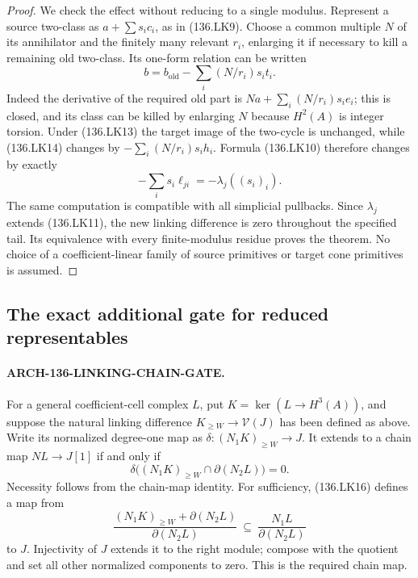 \begin{proof}
We check the effect without reducing to a single modulus.
Represent a source two-class as \(a+\sum s_i c_i\), as
in (136.LK9).  Choose a common multiple \(N\) of its
annihilator and the finitely many relevant \(r_i\), enlarging
it if necessary to kill a remaining old two-class.  Its
one-form relation can be written
\[
                    b=b_{\mathrm{old}}-
                         \sum_i(N/r_i)s_i t_i.
                                                               \tag{136.LK14}
\]
Indeed the derivative of the required old part is
\(Na+\sum_i(N/r_i)s_i e_i\); this is closed, and its
class can be killed by enlarging \(N\) because \(H^2(A)\)
is integer torsion.  Under (136.LK13) the target image of the
two-cycle is unchanged, while (136.LK14) changes by
\(-\sum_i(N/r_i)s_i h_i\).  Formula (136.LK10) therefore
changes by exactly
\[
                        -\sum_i s_i\ell_{ji}
                              =-\lambda_j((s_i)_i).
                                                               \tag{136.LK15}
\]
The same computation is compatible with all simplicial pullbacks.
Since \(\lambda_j\) extends (136.LK11), the new linking
difference is zero throughout the specified tail.  Its equivalence
with every finite-modulus residue proves the theorem.  No choice
of a coefficient-linear family of source primitives or target
cone primitives is assumed.
\end{proof}

\subsection{The exact additional gate for reduced representables}

\paragraph{ARCH-136-LINKING-CHAIN-GATE.}
For a general coefficient-cell complex \(L\), put
\(K=\ker(L\to H^3(A))\), and suppose the natural linking
difference \(K_{\geq W}\to\mathcal V(J)\) has been
defined as above.  Write its normalized degree-one map as
\(\delta:(N_1K)_{\geq W}\to J\).  It extends to a
chain map \(NL\to J[1]\) if and only if
\[
 \delta\bigl((N_1K)_{\geq W}\cap
                      \partial(N_2L)\bigr)=0.
                                                               \tag{136.LK16}
\]
Necessity follows from the chain-map identity.  For sufficiency,
(136.LK16) defines a map from
\[
 \frac{(N_1K)_{\geq W}+\partial(N_2L)}{\partial(N_2L)}
                      \ \subseteq\ \frac{N_1L}{\partial(N_2L)}
\]
to \(J\).  Injectivity of \(J\) extends it to the right
module; compose with the quotient and set all other normalized
components to zero.  This is the required chain map.

